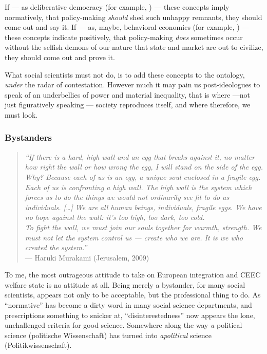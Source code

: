 If --- as deliberative democracy (for example, \citealt{Elster-1998-aa}) --- these concepts imply normatively, that policy-making \emph{should} shed such unhappy remnants, they should come out and say it. If --- as, maybe, behavioral economics (for example, \citealt{Tomasello2009}) --- these concepts indicate positively, that policy-making \emph{does} sometimes occur without the selfish demons of our nature that state and market are out to civilize, they should come out and prove it. 

What social scientists must not do, is to add these concepts to the ontology, \emph{under} the radar of contestation. However much it may pain us post-ideologues to speak of \citeauthor{Agnoli-1989-aa}an underbellies of power and material inequality, that is where ---not just figuratively speaking --- society reproduces itself, and where therefore, we must look.

\subsubsection{Bystanders}

\begin{quote}
	\emph{``If there is a hard, high wall and an egg that breaks against it, no matter how right the wall or how wrong the egg, I will stand on the side of the egg. \\
	Why? Because each of us is an egg, a unique soul enclosed in a fragile egg. Each of us is confronting a high wall. The high wall is the system which forces us to do the things we would not ordinarily see fit to do as individuals. [\ldots] We are all human beings, individuals, fragile eggs. We have no hope against the wall: it's too high, too dark, too cold. \\
	To fight the wall, we must join our souls together for warmth, strength. We must not let the system control us --- create who we are. It is we who created the system.''}\\
	--- Haruki Murakami (Jerusalem, 2009)
\end{quote}

To me, the most outrageous attitude to take on European integration and \gls{CEEC} welfare state is no attitude at all. Being merely a bystander, for many social scientists, appears not only to be acceptable, but the professional thing to do. As ``normative'' has become a dirty word in many social science departments, and prescriptions something to snicker at, ``disinterestedness'' now appears the lone, unchallenged criteria for good science. Somewhere along the way \emph{a} political science (politische Wissenschaft) has turned into \emph{apolitical} science (Politikwissenschaft).

